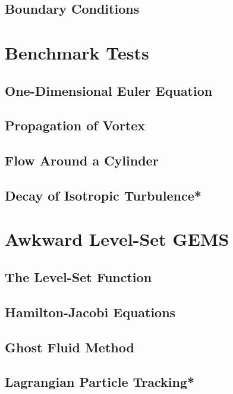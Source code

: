 \documentclass[12pt, letterpaper]{report}
\begin{document}
\section{Boundary Conditions}

\chapter{Benchmark Tests}

\section{One-Dimensional Euler Equation}

\section{Propagation of Vortex}

\section{Flow Around a Cylinder}

\section{Decay of Isotropic Turbulence*}

\chapter{Awkward Level-Set GEMS}

\section{The Level-Set Function}

\section{Hamilton-Jacobi Equations}

\section{Ghost Fluid Method}

\section{Lagrangian Particle Tracking*}









\clearpage


\end{document}
